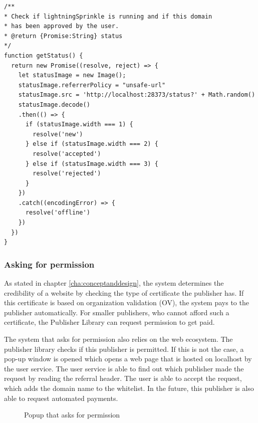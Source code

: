 \lstset{language=JavaScript}
\lstset{frame=lines}
\lstset{basicstyle=\footnotesize}
\begin{lstlisting}
/**
* Check if lightningSprinkle is running and if this domain 
* has been approved by the user.
* @return {Promise:String} status
*/
function getStatus() {
  return new Promise((resolve, reject) => {
    let statusImage = new Image();
    statusImage.referrerPolicy = "unsafe-url"
    statusImage.src = 'http://localhost:28373/status?' + Math.random()
    statusImage.decode()
    .then(() => {
      if (statusImage.width === 1) {
        resolve('new')
      } else if (statusImage.width === 2) {
        resolve('accepted')
      } else if (statusImage.width === 3) {
        resolve('rejected')
      }
    })
    .catch((encodingError) => {
      resolve('offline')
    })
  })
}
\end{lstlisting}

\subsubsection{Asking for permission}
As stated in chapter \ref{cha:conceptanddesign}, the system determines the credibility of a website by checking the type of certificate the publisher has. If this certificate is based on organization validation (OV), the system pays to the publisher automatically. For smaller publishers, who cannot afford such a certificate, the Publisher Library can request permission to get paid. 

The system that asks for permission also relies on the web ecosystem. The publisher library checks if this publisher is permitted. If this is not the case, a pop-up window is opened which opens a web page that is hosted on localhost by the user service. The user service is able to find out which publisher made the request by reading the referral header. The user is able to accept the request, which adds the domain name to the whitelist. In the future, this publisher is also able to request automated payments.

\begin{figure}[h!]
  \setlength{\fboxsep}{0pt}%
  \caption{Popup that asks for permission}
\end{figure}

